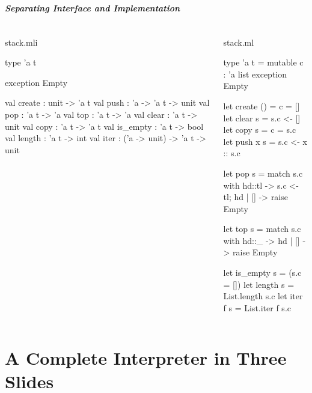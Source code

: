 \documentclass{plt}
\begin{document}
\begin{frame}[fragile]
  \frametitle{Separating Interface and Implementation}

\begin{columns}
  \begin{column}[t]{0.5\textwidth}
stack.mli
\medskip
\begin{ocaml}
type 'a t

exception Empty

val create : unit -> 'a t
val push : 'a -> 'a t -> unit
val pop : 'a t -> 'a
val top : 'a t -> 'a
val clear : 'a t -> unit
val copy : 'a t -> 'a t
val is_empty : 'a t -> bool
val length : 'a t -> int
val iter : ('a -> unit) ->
                 'a t -> unit
\end{ocaml}
  \end{column}
  \begin{column}[t]{0.5\textwidth}
stack.ml
\medskip
\begin{ocaml}
type 'a t =
   { mutable c : 'a list }
exception Empty

let create () = { c = [] }
let clear s = s.c <- []
let copy s = { c = s.c }
let push x s = s.c <- x :: s.c

let pop s =
  match s.c with
    hd::tl -> s.c <- tl; hd
  | []     -> raise Empty

let top s =
  match s.c with
    hd::_ -> hd
  | []    -> raise Empty

let is_empty s = (s.c = [])
let length s = List.length s.c
let iter f s = List.iter f s.c
\end{ocaml}
  \end{column}
\end{columns}

\end{frame}

\part{A Complete Interpreter in Three Slides}
\frame{\partpage}
\end{document}
